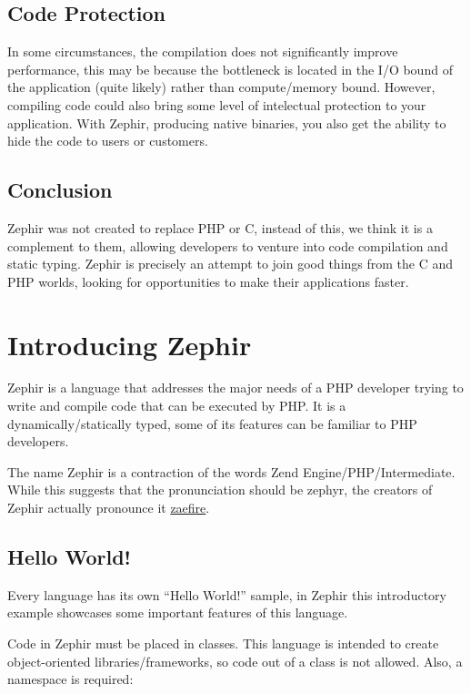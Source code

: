 \documentclass[letterpaper,10pt,english]{sphinxmanual}
\begin{document}
\subsection{Code Protection}
\label{motivation:code-protection}
In some circumstances, the compilation does not significantly improve performance, this may be because the bottleneck is located
in the I/O bound of the application (quite likely) rather than compute/memory bound.
However, compiling code could also bring some level of intelectual protection to your application.
With Zephir, producing native binaries, you also get the ability to hide the code to users or customers.


\subsection{Conclusion}
\label{motivation:conclusion}
Zephir was not created to replace PHP or C, instead of this, we think it is a complement to them,
allowing developers to venture into code compilation and static typing.
Zephir is precisely an attempt to join good things from the C and PHP worlds,
looking for opportunities to make their applications faster.


\section{Introducing Zephir}
\label{intro::doc}\label{intro:introducing-zephir}
Zephir is a language that addresses the major needs of a PHP developer trying to write and compile code that
can be executed by PHP. It is a dynamically/statically typed, some of its features can be familiar to
PHP developers.

The name Zephir is a contraction of the words Zend Engine/PHP/Intermediate. While this suggests that the
pronunciation should be zephyr, the creators of Zephir actually pronounce it \href{http://translate.google.com/\#en/en/zaefire}{zaefire}.


\subsection{Hello World!}
\label{intro:hello-world}
Every language has its own ``Hello World!'' sample, in Zephir this introductory example showcases some important
features of this language.

Code in Zephir must be placed in classes. This language is intended to create object-oriented libraries/frameworks,
so code out of a class is not allowed. Also, a namespace is required:
\end{document}
